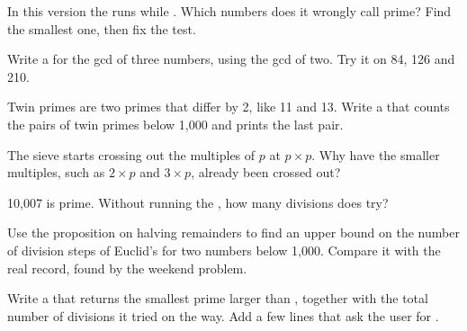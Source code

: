 \begin{exercise}[$\star\star$]\label{exo:g9:algorithms-on-numbers:6}
In this version the  runs while . Which numbers does it
wrongly call prime? Find the smallest one, then fix the test.

\label{lst:g9:algorithms-on-numbers:square-bug}
\end{exercise}

\begin{exercise}[$\star\star$]\label{exo:g9:algorithms-on-numbers:7}
Write a   for the gcd of three numbers, using the
gcd of two. Try it on 84, 126 and 210.
\end{exercise}

\begin{exercise}[$\star\star$]\label{exo:g9:algorithms-on-numbers:8}
Twin primes are two primes that differ by 2, like 11 and 13. Write a 
that counts the pairs of twin primes below 1,000 and prints the last pair.
\end{exercise}

\begin{exercise}[$\star\star$]\label{exo:g9:algorithms-on-numbers:9}
The sieve starts crossing out the multiples of $p$ at $p \times p$. Why have the
smaller multiples, such as $2 \times p$ and $3 \times p$, already been crossed
out?
\end{exercise}

\begin{exercise}[$\star\star\star$]\label{exo:g9:algorithms-on-numbers:10}
10,007 is prime. Without running the , how many divisions does
 try?
\end{exercise}

\begin{exercise}[$\star\star\star$]\label{exo:g9:algorithms-on-numbers:11}
Use the proposition on halving remainders to find an upper bound on the number
of division steps of Euclid's  for two numbers below 1,000. Compare it
with the real record, found by the weekend problem.
\end{exercise}

\begin{exercise}[$\star\star\star$]\label{exo:g9:algorithms-on-numbers:12}
Write a   that returns the smallest prime larger
than , together with the total number of divisions it tried on the way.
Add a few lines that ask the user for .
\end{exercise}

